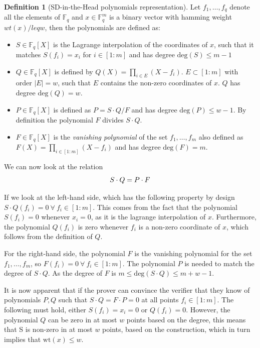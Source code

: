 \documentclass[11pt]{report}
\theoremstyle{definition}
\newtheorem{definition}{Definition}[section]
\theoremstyle{plain}
\begin{document}
\begin{definition}[SD-in-the-Head polynomials representation]\label{def:sdith-polynomials}
  Let $f_1,\dots, f_q$ denote all the elements of $\mathbb{F}_q$ and $x\in \mathbb{F}^m_q$ is a binary vector with hamming weight $wt(x) /leq w$, then the polynomials are defined as:
  \begin{itemize}
    \item $S\in \mathbb{F}_q[X]$ is the Lagrange interpolation of the coordinates of $x$, such that it matches $S(f_i) = x_i$ for $i\in [1:m]$ and has degree $\text{deg}(S) \leq m-1$
    \item $Q\in \mathbb{F}_q[X]$ is defined by $Q(X) = \prod_{i\in E}(X - f_i)$. $E \subset [1:m]$ with order $|E| = w$, such that $E$ contains the non-zero coordinates of $x$. $Q$ has degree $\text{deg}(Q) = w$.
    \item $P\in \mathbb{F}_q[X]$ is defined as $P = S\cdot Q/F$ and has degree $\text{deg}(P) \leq w-1$. By definition the polynomial $F$ divides $S\cdot Q$.
    \item $F\in \mathbb{F}_q[X]$ is the \textit{vanishing polynomial} of the set ${f_1, \dots, f_m}$ also defined as $F(X) = \prod_{i\in [1:m]}(X - f_i)$ and has degree $\text{deg}(F) = m$.
  \end{itemize}
\end{definition}

We can now look at the relation
\begin{equation}
  \centering
  S\cdot Q = P\cdot F\label{eq:polynomial_representation}
\end{equation}

If we look at the left-hand side, which has the following property by design $S\cdot Q(f_i) = 0 \ \forall\ f_i \in [1:m]$. This comes from the fact that the polynomial $S(f_i) = 0$ whenever $x_i = 0$, as it is the lagrange interpolation of $x$. Furthermore, the polynomial $Q(f_i)$ is zero whenever $f_i$ is a non-zero coordinate of $x$, which follows from the definition of $Q$.

For the right-hand side, the polynomial $F$ is the vanishing polynomial for the set ${f_1, \dots, f_m}$, so $F(f_i) = 0\ \forall\ f_i \in [1:m]$. The polynomial $P$ is needed to match the degree of $S \cdot Q$. As the degree of $F$ is $m \leq \text{deg}(S\cdot Q) \leq m + w - 1$.

It is now apparent that if the prover can convince the verifier that they know of polynomials $P,Q$ such that $S\cdot Q = F \cdot P = 0$ at all points $f_i \in [1:m]$. The following must hold, either $S(f_i) = x_i = 0$ or $Q(f_i) = 0$. However, the polynomial $Q$ can be zero in at most $w$ points based on the degree, this means that S is non-zero in at most $w$ points, based on the construction, which in turn implies that $\text{wt}(x) \leq w$.
\end{document}
